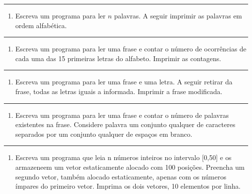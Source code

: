\documentclass[12pt,a4paper]{article}
\providecommand{\tightlist}{%
      \setlength{\itemsep}{0pt}\setlength{\parskip}{0pt}}
\begin{document}
    \begin{center}\rule{0.5\linewidth}{0.5pt}\end{center}

\begin{enumerate}
\def\labelenumi{\arabic{enumi}.}
\setcounter{enumi}{21}
\tightlist
\item
  Escreva um programa para ler \(n\) palavras. A seguir imprimir as
  palavras em ordem alfabética.
\end{enumerate}

    \begin{center}\rule{0.5\linewidth}{0.5pt}\end{center}

\begin{enumerate}
\def\labelenumi{\arabic{enumi}.}
\setcounter{enumi}{22}
\tightlist
\item
  Escreva um programa para ler uma frase e contar o número de
  ocorrências de cada uma das 15 primeiras letras do alfabeto. Imprimir
  as contagens.
\end{enumerate}

    \begin{center}\rule{0.5\linewidth}{0.5pt}\end{center}

\begin{enumerate}
\def\labelenumi{\arabic{enumi}.}
\setcounter{enumi}{23}
\tightlist
\item
  Escreva um programa para ler uma frase e uma letra. A seguir retirar
  da frase, todas as letras iguais a informada. Imprimir a frase
  modificada.
\end{enumerate}

    \begin{center}\rule{0.5\linewidth}{0.5pt}\end{center}

\begin{enumerate}
\def\labelenumi{\arabic{enumi}.}
\setcounter{enumi}{24}
\tightlist
\item
  Escreva um programa para ler uma frase e contar o número de palavras
  existentes na frase. Considere palavra um conjunto qualquer de
  caracteres separados por um conjunto qualquer de espaços em branco.
\end{enumerate}

    \begin{center}\rule{0.5\linewidth}{0.5pt}\end{center}

\begin{enumerate}
\def\labelenumi{\arabic{enumi}.}
\setcounter{enumi}{25}
\tightlist
\item
  Escreva um programa que leia n números inteiros no intervalo
  {[}0,50{]} e os armazeneem um vetor estaticamente alocado com 100
  posições. Preencha um segundo vetor, também alocado estaticamente,
  apenas com os números ímpares do primeiro vetor. Imprima os dois
  vetores, 10 elementos por linha.
\end{enumerate}
\end{document}
